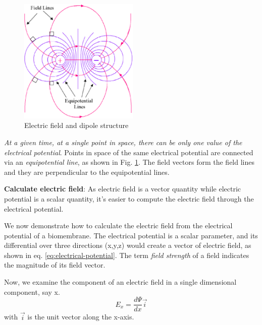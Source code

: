 


\begin{figure}[htb]
  \centerline{\includegraphics[height=6cm]{./images/equipotential-lines.eps}}
  \caption{Electric field and dipole structure} \label{fig:equipotential-lines}
\end{figure}

{\it At a given time, at a single point in space, there can be only
  one value of the electrical potential}.
Points in space of the same electrical potential are connected via an
{\it equipotential line}, as shown in
Fig. \ref{fig:equipotential-lines}. The field vectors form the field
lines and they are perpendicular to the equipotential lines.

{\bf Calculate electric field}: As electric field is a vector quantity
while electric potential is a scalar quantity, it's easier to compute
the electric field through the electrical potential.

We now demonstrate how to calculate the electric field from the
electrical potential of a biomembrane. The electrical potential is a
scalar parameter, and its differential over three directions (x,y,z)
would create a vector of electric field, as shown in
eq. \eqref{eq:electrical-potential}. The term {\it field strength} of
a field indicates the magnitude of its field vector.

Now, we examine the component of an electric field in a single
dimensional component, say x.
\begin{equation}
  E_x = \frac{d\Psi}{dx}\vec{i}
\end{equation}
with $\vec{i}$ is the unit vector along the x-axis.

